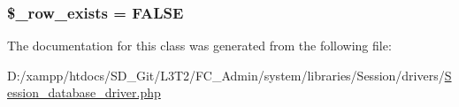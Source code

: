 \subsubsection[{\$\+\_\+row\+\_\+exists}]{\setlength{\rightskip}{0pt plus 5cm}\$\+\_\+row\+\_\+exists = F\+A\+L\+S\+E\hspace{0.3cm}{\ttfamily [protected]}}\label{class_c_i___session__database__driver_a73dea3734ad53aa2affc8eb734db5525}


The documentation for this class was generated from the following file\+:\begin{DoxyCompactItemize}
\item 
D\+:/xampp/htdocs/\+S\+D\+\_\+\+Git/\+L3\+T2/\+F\+C\+\_\+\+Admin/system/libraries/\+Session/drivers/\hyperlink{_session__database__driver_8php}{Session\+\_\+database\+\_\+driver.\+php}\end{DoxyCompactItemize}
